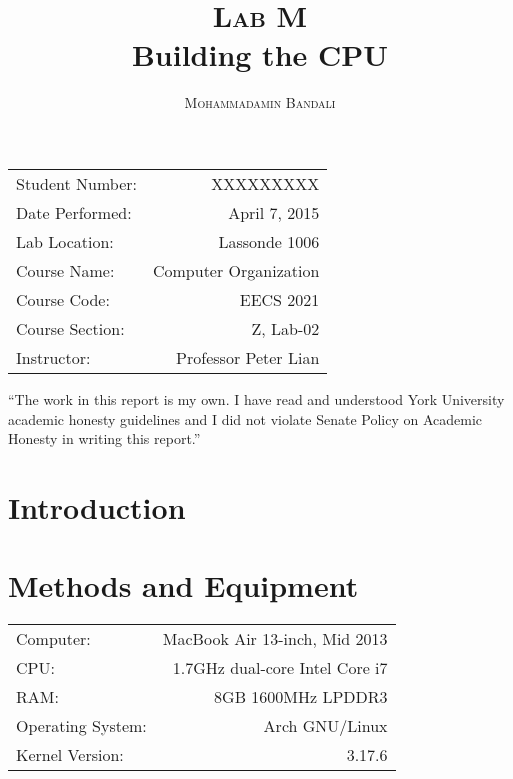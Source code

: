 \documentclass{article}
\title{\textsc{Lab M} \\ Building the CPU } %
\author{\textsc{Mohammadamin Bandali}} %
\date{} %
\newenvironment{statement}{\par\vspace{50ex}}{\clearpage}
\begin{document}
\maketitle %

\begin{center}
\begin{tabular}{l r}
Student Number: & XXXXXXXXX \\ 
Date Performed: & April 7, 2015 \\ %
Lab Location: & Lassonde 1006 \\ 
Course Name: & Computer Organization \\ 
Course Code: & EECS 2021 \\ 
Course Section: & Z, Lab-02\\ 
Instructor: & Professor Peter Lian %
\end{tabular}
\end{center}

\begin{statement}
“The work in this report is my own. I have read and understood York University
academic honesty guidelines and I did not violate Senate Policy on Academic
Honesty in writing this report.”
\end{statement}


\section{Introduction}



\section{Methods and Equipment}

\begin{center}
\begin{tabular}{l r}
Computer: & MacBook Air 13-inch, Mid 2013 \\
CPU: & 1.7GHz dual-core Intel Core i7 \\
RAM: & 8GB 1600MHz LPDDR3 \\
Operating System: & Arch GNU/Linux \\
Kernel Version: & 3.17.6
\end{tabular}
\end{center}
\end{document}
